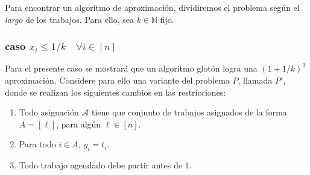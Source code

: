 \documentclass[10pt]{article}
\newcommand{\N}{\mathbb N}
\theoremstyle{plain}
\theoremstyle{definition}
\begin{document}
Para encontrar un algoritmo de aproximaci\'on, dividiremos el problema según el \textit{largo} de los trabajos. Para ello, sea $k \in \N$ fijo.
\subsubsection*{caso $x_i \leq 1/k \quad \forall i \in [n]$}



Para el presente caso se mostrar\'a que un algoritmo glot\'on logra una $(1+1/k)^2$ aproximaci\'on. Considere para ello una variante del problema $P$, llamada $P'$, donde se realizan los siguientes cambios en las restricciones: 
\begin{enumerate}
\item Todo asignación $\mathcal{A}$ tiene que conjunto de trabajos asignados de la forma $A=[\ell]$, para algún $\ell \in [n]$. 
\item Para todo $i \in A$, $y_i = t_i$.
\item Todo trabajo agendado debe partir antes de $1$. 
\end{enumerate}
\end{document}
